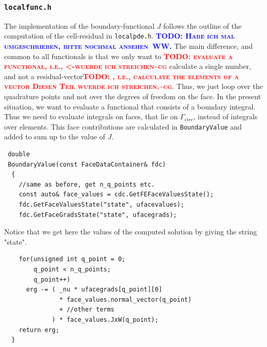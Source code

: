 \documentclass[smallextended]{svjour3}       %
\numberwithin{equation}{section}
\newcommand{\todo}[1]{\textbf{\textsc{\textcolor{blue}{TODO: #1}}}}
\newcommand{\todocg}[1]{\textbf{\textsc{\textcolor{red}{TODO: #1\textasciitilde cg}}}}
\begin{document}
\subsubsection{\texttt{localfunc.h}}
The implementation of the boundary-functional $J$ follows the outline of the
computation of the cell-residual in \texttt{localpde.h}. 
\todo{Habe ich mal umgeschrieben, bitte nochmal ansehen~WW.}
The main difference, and common to all functionals is that we only want to
\todocg{ evaluate a functional, i.e., <-wuerde ich streichen} calculate a single number, and not a
residual-vector\todocg{, i.e., calculate the elements of a vector Diesen Teil wuerde ich streichen.}. Thus, we 
just loop over the quadrature points and not over the degrees of freedom 
on the face. In the present situation, we want to evaluate a functional 
that consists of a boundary integral. Thus we need to evaluate 
integrals on faces, that lie on $\Gamma_{circ}$, instead of integrals over
elements. 
This face contributions are calculated in \texttt{BoundaryValue} and added to 
sum up to the value of $J$. 

\begin{lstlisting}
 double
 BoundaryValue(const FaceDataContainer& fdc)
  {
    //same as before, get n_q_points etc.
    const auto& face_values = cdc.GetFEFaceValuesState();
    fdc.GetFaceValuesState("state", ufacevalues);
    fdc.GetFaceGradsState("state", ufacegrads);
\end{lstlisting}
Notice that we get here the values of the computed solution by giving the string "state".
\begin{lstlisting}
    for(unsigned int q_point = 0; 
        q_point < n_q_points; 
        q_point++)
      erg -= ( _nu * ufacegrads[q_point][0]
               * face_values.normal_vector(q_point)
               + //other terms        
             ) * face_values.JxW(q_point);
    return erg;
  }
\end{lstlisting}
\end{document}
